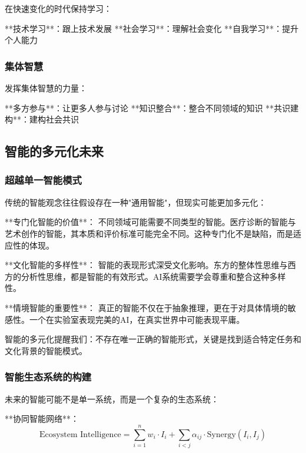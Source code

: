 在快速变化的时代保持学习：

**技术学习**：跟上技术发展
**社会学习**：理解社会变化
**自我学习**：提升个人能力

\subsubsection{集体智慧}

发挥集体智慧的力量：

**多方参与**：让更多人参与讨论
**知识整合**：整合不同领域的知识
**共识建构**：建构社会共识

\subsection{智能的多元化未来} %

\subsubsection{超越单一智能模式}

传统的智能观念往往假设存在一种"通用智能"，但现实可能更加多元化：

**专门化智能的价值**：
不同领域可能需要不同类型的智能。医疗诊断的智能与艺术创作的智能，其本质和评价标准可能完全不同。这种专门化不是缺陷，而是适应性的体现。

**文化智能的多样性**：
智能的表现形式深受文化影响。东方的整体性思维与西方的分析性思维，都是智能的有效形式。AI系统需要学会尊重和整合这种多样性。

**情境智能的重要性**：
真正的智能不仅在于抽象推理，更在于对具体情境的敏感性。一个在实验室表现完美的AI，在真实世界中可能表现平庸。

\begin{center}
智能的多元化提醒我们：不存在唯一正确的智能形式，关键是找到适合特定任务和文化背景的智能模式。
\end{center}

\subsubsection{智能生态系统的构建}

未来的智能可能不是单一系统，而是一个复杂的生态系统：

**协同智能网络**：
\begin{equation}
\text{Ecosystem Intelligence} = \sum_{i=1}^n w_i \cdot I_i + \sum_{i<j} \alpha_{ij} \cdot \text{Synergy}(I_i, I_j)
\end{equation}

